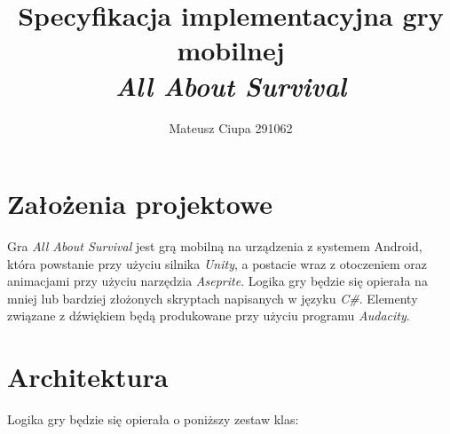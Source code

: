 \documentclass[12pt, a4paper]{article}
\author{Mateusz Ciupa 291062}
\title{Specyfikacja implementacyjna gry mobilnej \\\textit{All About Survival}}
\begin{document}
\maketitle
\tableofcontents

\section{Założenia projektowe}
Gra \textit{All About Survival} jest grą mobilną na urządzenia z systemem
Android, która powstanie przy użyciu silnika \textit{Unity}, a postacie wraz 
z otoczeniem oraz animacjami przy użyciu narzędzia \textit{Aseprite}. Logika 
gry będzie się opierała na mniej lub bardziej złożonych skryptach napisanych 
w języku \textit{C\#}. Elementy związane z dźwiękiem będą produkowane przy
użyciu programu \textit{Audacity}.

\section{Architektura}
Logika gry będzie się opierała o poniższy zestaw klas$\colon$
\end{document}
